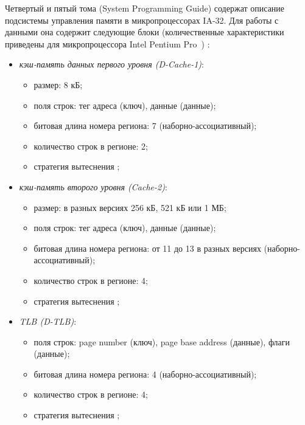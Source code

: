 Четвертый и пятый тома (System Programming Guide) содержат описание подсистемы управления памяти в
микропроцессорах IA-32. Для работы с данными она содержит следующие блоки
(количественные характеристики приведены для микропроцессора Intel Pentium
Pro~\cite{PentiumPro}) :
\begin{itemize}
  \item \emph{кэш-память данных первого уровня (D-Cache-1)}:
        \begin{itemize}
            \item размер: 8 кБ;
            \item поля строк: тег адреса (ключ), данные (данные);
            \item битовая длина номера региона: 7 (наборно-ассоциативный);
            \item количество строк в регионе: 2;
            \item стратегия вытеснения \LRU;
        \end{itemize}

  \item \emph{кэш-память второго уровня (Cache-2)}:
        \begin{itemize}
            \item размер: в разных версиях 256 кБ, 521 кБ или 1 МБ;
            \item поля строк: тег адреса (ключ), данные (данные);
            \item битовая длина номера региона: от 11 до 13 в разных версиях
(наборно-ассоциативный);
            \item количество строк в регионе: 4;
            \item стратегия вытеснения \LRU;
        \end{itemize}

  \item \emph{TLB (D-TLB)}:
        \begin{itemize}
            \item поля строк: page number (ключ), page base address (данные),
флаги (данные);
            \item битовая длина номера региона: 4 (наборно-ассоциативный);
            \item количество строк в регионе: 4;
            \item стратегия вытеснения \LRU;
        \end{itemize}


\end{itemize}
